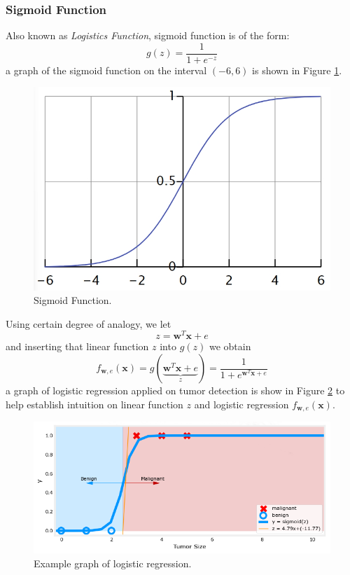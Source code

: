 \documentclass[12pt, twoside]{article}
\begin{document}
\begin{multicols*}{2}
		\subsubsection{Sigmoid Function}
		Also known as \textit{Logistics Function}, sigmoid function is of the form:
		$$ g(z)=\frac{1}{1+e^{-z}} $$ 
		a graph of the sigmoid function on the interval $(-6,6)$ is shown in Figure \ref{fig:sigmoid}.
		\begin{figure}[H]
			\centering
			\includegraphics[width=\columnwidth]{sigmoid}
			\caption{Sigmoid Function.\cite{enwiki:1188449633}}
			\label{fig:sigmoid}
		\end{figure}
		\noindent Using certain degree of analogy, we let
		$$ z=\mathbf{w}^T\mathbf{x}+e $$
		and inserting that linear function $z$ into $g(z)$ we obtain
		$$
		f_{\mathbf{w},e}(\mathbf{x})=
		g(\underbrace{\mathbf{w}^T\mathbf{x}+e}_z)=
		\frac{1}{1+e^{\mathbf{w}^T\mathbf{x}+e}}
		$$
		\noindent a graph of logistic regression applied on tumor detection is show in Figure \ref{fig:logis-eg2} to help establish intuition on linear function $z$ and logistic regression $f_{\mathbf{w},e}(\mathbf{x})$.
		\begin{figure}[H]
			\centering
			\includegraphics[width=\columnwidth]{logis-eg2}
			\caption{Example graph of logistic regression.\cite{enwiki:1188449633}}
			\label{fig:logis-eg2}
		\end{figure}
		

\end{multicols*}
\end{document}
